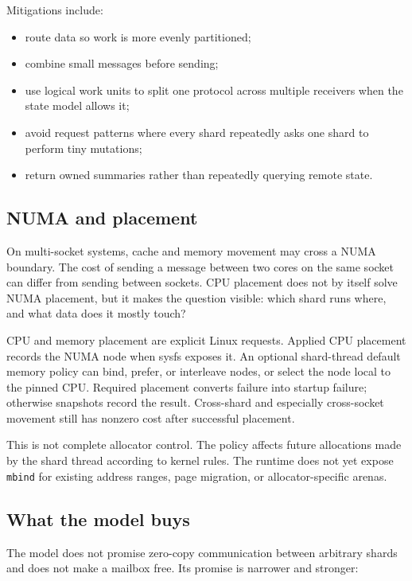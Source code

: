 Mitigations include:

\begin{itemize}
    \item route data so work is more evenly partitioned;
    \item combine small messages before sending;
    \item use logical work units to split one protocol across multiple
          receivers when the state model allows it;
    \item avoid request patterns where every shard repeatedly asks one shard to
          perform tiny mutations;
    \item return owned summaries rather than repeatedly querying remote state.
\end{itemize}

\subsection{NUMA and placement}

On multi-socket systems, cache and memory movement may cross a NUMA boundary.
The cost of sending a message between two cores on the same socket can differ
from sending between sockets. CPU placement does not by itself solve NUMA
placement, but it makes the question visible: which shard runs where, and what
data does it mostly touch?

CPU and memory placement are explicit Linux requests. Applied CPU placement
records the NUMA node when sysfs exposes it. An optional shard-thread default
memory policy can bind, prefer, or interleave nodes, or select the node local to
the pinned CPU. Required placement converts failure into startup failure;
otherwise snapshots record the result. Cross-shard and especially cross-socket
movement still has nonzero cost after successful placement.

This is not complete allocator control. The policy affects future allocations
made by the shard thread according to kernel rules. The runtime does not yet
expose \texttt{mbind} for existing address ranges, page migration, or
allocator-specific arenas.

\subsection{What the model buys}

The model does not promise zero-copy communication between arbitrary shards and
does not make a mailbox free. Its promise is narrower and stronger:


